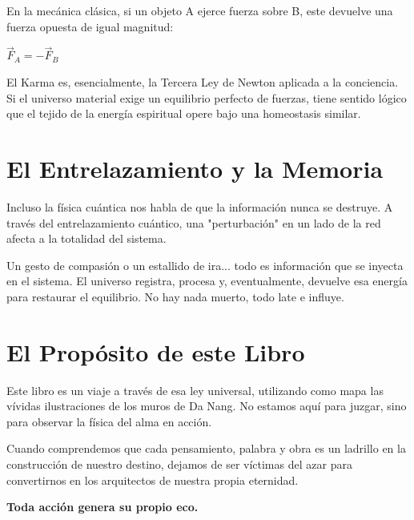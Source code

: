 En la mecánica clásica, si un objeto A ejerce fuerza sobre B, este devuelve una fuerza opuesta de igual magnitud:

\begin{center}
$\vec{F}_{A} = -\vec{F}_{B}$
\end{center}

El Karma es, esencialmente, la Tercera Ley de Newton aplicada a la conciencia. Si el universo material exige un equilibrio perfecto de fuerzas, tiene sentido lógico que el tejido de la energía espiritual opere bajo una homeostasis similar.


\section{El Entrelazamiento y la Memoria}
Incluso la física cuántica nos habla de que la información nunca se destruye. A través del entrelazamiento cuántico, una "perturbación" en un lado de la red afecta a la totalidad del sistema.

Un gesto de compasión o un estallido de ira... todo es información que se inyecta en el sistema. El universo registra, procesa y, eventualmente, devuelve esa energía para restaurar el equilibrio. No hay nada muerto, todo late e influye.


\section{El Propósito de este Libro}
Este libro es un viaje a través de esa ley universal, utilizando como mapa las vívidas ilustraciones de los muros de Da Nang. No estamos aquí para juzgar, sino para observar la física del alma en acción.

Cuando comprendemos que cada pensamiento, palabra y obra es un ladrillo en la construcción de nuestro destino, dejamos de ser víctimas del azar para convertirnos en los arquitectos de nuestra propia eternidad.

\vspace{1em}
\begin{center}
    \textbf{\Large Toda acción genera su propio eco.}
\end{center}
\vspace{1em}

